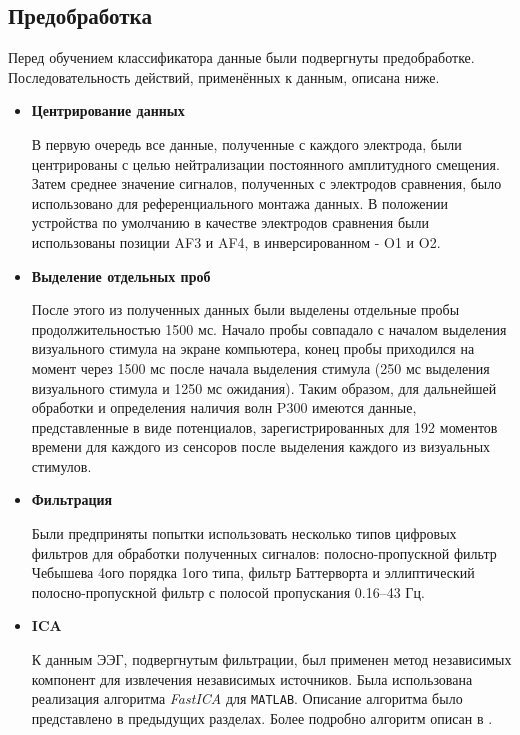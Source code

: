 \documentclass[12pt,fleqn]{article}
\begin{document}
\subsection{Предобработка}
	\par Перед обучением классификатора данные были подвергнуты предобработке. Последовательность действий, применённых к данным, описана ниже. 
	\begin{itemize}
	\item
	{\bf Центрирование данных}
	\par В первую очередь все данные, полученные с каждого электрода, были центрированы с целью нейтрализации постоянного амплитудного смещения. Затем среднее значение сигналов, полученных с электродов сравнения, было использовано для референциального монтажа данных. В положении устройства по умолчанию в качестве электродов сравнения были использованы позиции AF3 и AF4, в инверсированном - O1 и O2.
	\item
	{\bf Выделение отдельных проб}
	\par После этого из полученных данных были выделены отдельные пробы продолжительностью 1500 мс. Начало пробы совпадало с началом выделения визуального стимула на экране компьютера, конец пробы приходился на момент через 1500 мс после начала выделения стимула (250 мс выделения визуального стимула и 1250 мс ожидания). Таким образом, для дальнейшей обработки и определения наличия волн P300 имеются данные, представленные в виде потенциалов, зарегистрированных для 192 моментов времени для каждого из сенсоров после выделения каждого из визуальных стимулов.
	\item
	{\bf Фильтрация}
	\par Были предприняты попытки использовать несколько типов цифровых фильтров для обработки полученных сигналов: полосно-пропускной фильтр Чебышева 4ого порядка 1ого типа, фильтр Баттерворта и эллиптический полосно-пропускной фильтр с полосой пропускания 0.16--43 Гц.
	\item
	{\bf ICA}
	\par К данным ЭЭГ, подвергнутым фильтрации, был применен метод независимых компонент для извлечения независимых источников. Была использована реализация алгоритма {\it FastICA} для {\tt MATLAB}. Описание алгоритма было представлено в предыдущих разделах. Более подробно алгоритм описан в \cite{FastICA}.
	\end{itemize}
\end{document}
